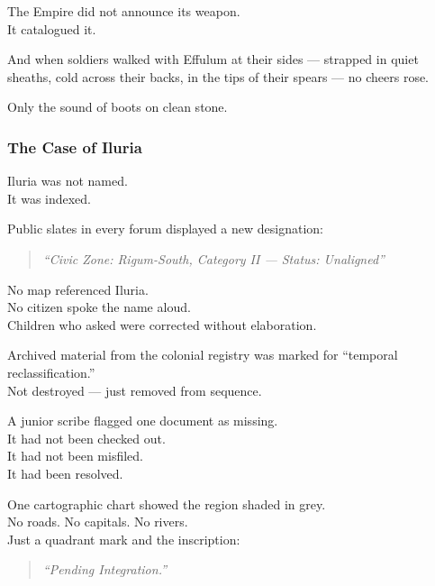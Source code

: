 \documentclass[12pt]{article}
\begin{document}
\vspace{1em}

The Empire did not announce its weapon.\\
It catalogued it.

And when soldiers walked with Effulum at their sides — strapped in quiet sheaths, cold across their backs, in the tips of their spears — no cheers rose.

Only the sound of boots on clean stone.

\dotfill

\subsubsection{The Case of Iluria}

Iluria was not named.\\
It was indexed.

Public slates in every forum displayed a new designation:

\begin{quote}
\textit{“Civic Zone: Rigum-South, Category II — Status: Unaligned”}
\end{quote}

No map referenced Iluria.\\
No citizen spoke the name aloud.\\
Children who asked were corrected without elaboration.

\vspace{1em}

Archived material from the colonial registry was marked for “temporal reclassification.”\\
Not destroyed — just removed from sequence.

A junior scribe flagged one document as missing.\\
It had not been checked out.\\
It had not been misfiled.\\
It had been resolved.

\vspace{1em}

One cartographic chart showed the region shaded in grey.\\
No roads. No capitals. No rivers.\\
Just a quadrant mark and the inscription:

\begin{quote}
\textit{“Pending Integration.”}
\end{quote}
\end{document}

